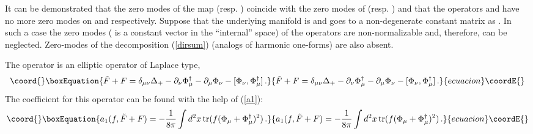 \documentclass[a4paper,12pt]{article}
\begin{document}
It can be demonstrated that the zero modes of the map
\coordHE{} (resp. 
\coordHE{}) coincide with the zero
modes of \myHighlight{$\Delta_+$}\coordHE{} (resp. \myHighlight{$\Delta_-$}\coordHE{}) and that the
operators \coordHE{} and \coordHE{} have no more zero
modes on \coordHE{} and \coordHE{} respectively.
Suppose that the underlying manifold is \coordHE{}
and \coordHE{} goes to a non-degenerate
constant matrix as \coordHE{}.
In such a case the zero modes \coordHE{}
(\coordHE{} is a constant vector in the ``internal'' space) of the
operators \myHighlight{$\Delta_\pm$}\coordHE{} are non-normalizable and, therefore,
can be neglected.
Zero-modes of the decomposition (\ref{dirsum}) (analogs
of harmonic one-forms) are also absent.

The operator \coordHE{} is an elliptic operator
of Laplace type,
\begin{equation}\coord{}\boxEquation{
\tilde F+F = \delta_{\mu\nu}\Delta_+ -\partial_\nu \Phi_\mu^\dag
-\partial_\mu\Phi_\nu -[\Phi_\nu ,\Phi_\mu^\dag ] \,.
\label{F+F}
}{
\tilde F+F = \delta_{\mu\nu}\Delta_+ -\partial_\nu \Phi_\mu^\dag
-\partial_\mu\Phi_\nu -[\Phi_\nu ,\Phi_\mu^\dag ] \,.
}{ecuacion}\coordE{}\end{equation}
The coefficient \coordHE{} for this operator can be found
with the help of (\ref{a1}):
\begin{equation}\coord{}\boxEquation{
a_1(f,\tilde F+F) =-\frac 1{8\pi} \int d^2x\,
{\rm tr} (f(\Phi_\mu +\Phi_\mu^\dag )^2)\,.
\label{a1FF}
}{
a_1(f,\tilde F+F) =-\frac 1{8\pi} \int d^2x\,
{\rm tr} (f(\Phi_\mu +\Phi_\mu^\dag )^2)\,.
}{ecuacion}\coordE{}\end{equation}
\end{document}
